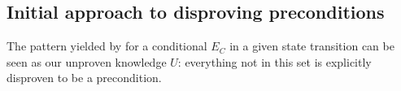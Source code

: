 \documentclass[\master/Master.tex]{subfiles}
\begin{document}
%



\subsection{Initial approach to disproving preconditions}\label{ssec:ca:init-approach}

The pattern yielded by  for a conditional $E_C$ in a given state transition can be seen as our unproven knowledge $U$: everything not in this set is explicitly disproven to be a precondition.
\end{document}
